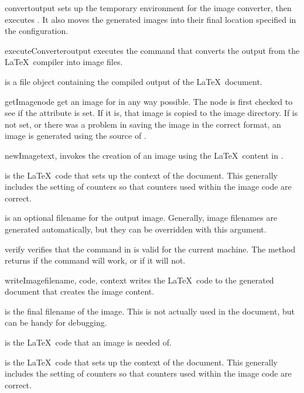 \begin{methoddesc}[Imager]{convert}{output}
sets up the temporary environment for the image converter, then executes
.  It also moves the generated images into
their final location specified in the configuration.
\end{methoddesc}

\begin{methoddesc}[Imager]{executeConverter}{output}
executes the command that converts the output from the \LaTeX\ compiler
into image files.

 is a file object containing the compiled output of the 
\LaTeX\ document.
\end{methoddesc}

\begin{methoddesc}[Imager]{getImage}{node}
get an image for  in any way possible.  The node is first checked
to see if the  attribute is set.  If it is, that 
image is copied to the image directory.  If  is
not set, or there was a problem in saving the image in the correct format,
an image is generated using the source of .
\end{methoddesc}

\begin{methoddesc}[Imager]{newImage}{text, }
invokes the creation of an image using the \LaTeX\ content in .

 is the \LaTeX\ code that sets up the context of the document.
This generally includes the setting of counters so that counters used
within the image code are correct.

 is an optional filename for the output image.  Generally, 
image filenames are generated automatically, but they can be overridden
with this argument.
\end{methoddesc}

\begin{methoddesc}[Imager]{verify}{}
verifies that the command in  is valid for the current
machine.  The  method returns  if the command will
work, or  if it will not.
\end{methoddesc}

\begin{methoddesc}[Imager]{writeImage}{filename, code, context}
writes the \LaTeX\ code to the generated document that creates the 
image content.

 is the final filename of the image.  This is not actually
used in the document, but can be handy for debugging.

 is the \LaTeX\ code that an image is needed of.

 is the \LaTeX\ code that sets up the context of the document.
This generally includes the setting of counters so that counters used
within the image code are correct.
\end{methoddesc}

